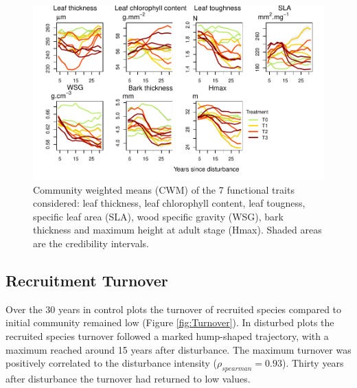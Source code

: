 \documentclass[fleqn,10pt]{ArtEcoFoG} %
\begin{document}
\begin{figure}

{\centering \includegraphics{RecruitmentTrajectories_files/figure-latex/CWM-1} 

}

\caption{Community weighted means (CWM) of the 7 functional traits considered: leaf thickness, leaf chlorophyll content, leaf tougness, specific leaf area (SLA), wood specific gravity (WSG), bark thickness and maximum height at adult stage (Hmax). Shaded areas are the credibility intervals.}\label{fig:CWM}
\end{figure}

\subsection{Recruitment Turnover}\label{recruitment-turnover}

Over the 30 years in control plots the turnover of recruited species
compared to initial community remained low (Figure \ref{fig:Turnover}).
In disturbed plots the recruited species turnover followed a marked
hump-shaped trajectory, with a maximum reached around 15 years after
disturbance. The maximum turnover was positively correlated to the
disturbance intensity (\(\rho_{spearman}=0.93\)). Thirty years after
disturbance the turnover had returned to low values.
\end{document}
